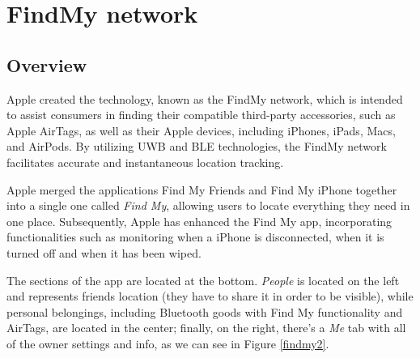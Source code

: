 \documentclass[english]{article}
\begin{document}
\section{FindMy network}\label{sec:find}
\subsection{Overview}
Apple created the technology, known as the FindMy network, which is intended to assist consumers in finding their compatible third-party accessories, such as Apple AirTags, as well as their Apple devices, including iPhones, iPads, Macs, and AirPods. By utilizing UWB and BLE technologies, the FindMy network facilitates accurate and instantaneous location tracking.

Apple merged the applications Find My Friends and Find My iPhone together into a single one called \textit{Find My}, allowing users to locate everything they need in one place. Subsequently, Apple has enhanced the Find My app, incorporating functionalities such as monitoring when a iPhone is disconnected, when it is turned off and when it has been wiped.

The sections of the app are located at the bottom. \textit{People} is located on the left and represents friends location (they have to share it in order to be visible), while personal belongings, including Bluetooth goods with Find My functionality and AirTags, are located in the center; finally, on the right, there's a \textit{Me} tab with all of the owner settings and info, as we can see in Figure \ref{findmy2}.
\end{document}
